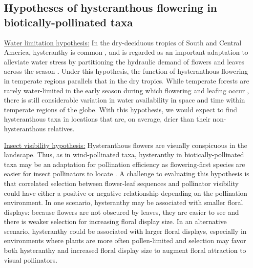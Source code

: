 \documentclass{article}[12pt]
\begin{document}
\subsection*{Hypotheses of hysteranthous flowering in biotically-pollinated taxa}

\underline{Water limitation hypothesis:} In the dry-deciduous tropics of South and Central America, hysteranthy is common \citep{Rathcke_1985,Franklin2016}, and is regarded as an important adaptation to alleviate water stress by partitioning the hydraulic demand of flowers and leaves across the season \citep{Borchert1983,Reich1984,Franklin2016,Gougherty2018}. Under this hypothesis, the function of hysteranthous flowering in temperate regions parallels that in the dry tropics. While temperate forests are rarely water-limited in the early season during which flowering and leafing occur \citep{Polgar2011}, there is still considerable variation in water availability in space and time within temperate regions of the globe. With this hypothesis, we would expect to find hysteranthous taxa in locations that are, on average, drier than their non-hysteranthous relatives.

\underline{Insect visibility hypothesis:} Hysteranthous flowers are visually conspicuous in the landscape. Thus, as in wind-pollinated taxa, hysteranthy in biotically-pollinated taxa may be an adaptation for pollination efficiency as flowering-first species are easier for insect pollinators to locate \citep{Janzen1967}. A challenge to evaluating this hypothesis is that correlated selection between flower-leaf sequences and pollinator visibility could have either a positive or negative relationship depending on the pollination environment. In one scenario, hysteranthy may be associated with smaller floral displays: because flowers are not obscured by leaves, they are easier to see and there is weaker selection for increasing floral display size. In an alternative scenario, hysteranthy could be associated with larger floral displays, especially in environments where plants are more often pollen-limited and selection may favor both hysteranthy and increased floral display size to augment floral attraction to visual pollinators.
\end{document}
